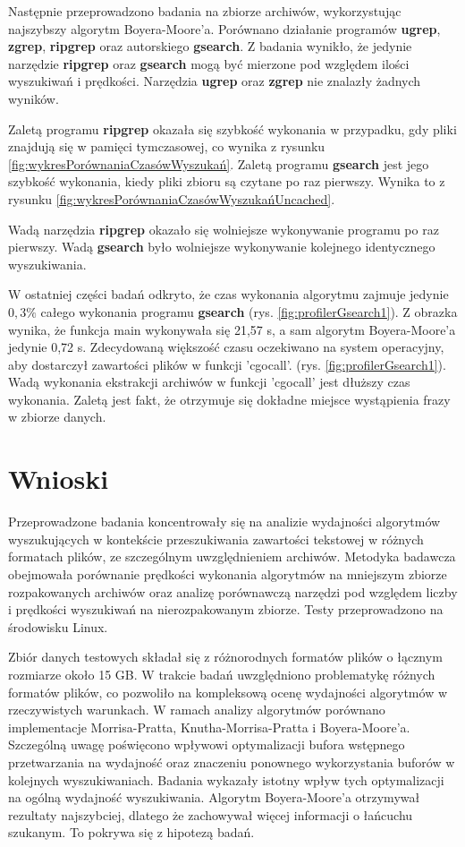 Następnie przeprowadzono badania na zbiorze archiwów, wykorzystując najszybszy algorytm 
Boyera-Moore'a. Porównano działanie programów \textbf{ugrep}, \textbf{zgrep},
\textbf{ripgrep} oraz autorskiego \textbf{gsearch}. Z badania wynikło, że
jedynie narzędzie \textbf{ripgrep} oraz \textbf{gsearch} mogą być mierzone pod
względem ilości wyszukiwań i prędkości. Narzędzia \textbf{ugrep} oraz 
\textbf{zgrep} nie znalazły żadnych wyników. 

Zaletą programu \textbf{ripgrep} okazała się szybkość wykonania w przypadku, gdy
pliki znajdują się w pamięci tymczasowej, co wynika z rysunku 
\ref{fig:wykresPorównaniaCzasówWyszukań}. Zaletą programu \textbf{gsearch} jest
jego szybkość wykonania, kiedy pliki zbioru są czytane po raz pierwszy. Wynika
to z rysunku \ref{fig:wykresPorównaniaCzasówWyszukańUncached}. 

Wadą narzędzia \textbf{ripgrep} okazało się wolniejsze wykonywanie programu po raz pierwszy.
Wadą \textbf{gsearch} było wolniejsze wykonywanie kolejnego identycznego wyszukiwania.

W ostatniej części badań odkryto, że czas wykonania algorytmu zajmuje jedynie
$0,3 \%$ całego wykonania programu \textbf{gsearch} (rys. \ref{fig:profilerGsearch1}).
Z obrazka wynika, że funkcja main wykonywała się 21,57 s, a sam algorytm 
Boyera-Moore'a jedynie 0,72 s. Zdecydowaną większość czasu oczekiwano na 
system operacyjny, aby dostarczył zawartości plików w funkcji 'cgocall'. 
(rys. \ref{fig:profilerGsearch1}). Wadą wykonania ekstrakcji archiwów w funkcji 
'cgocall' jest dłuższy czas wykonania. Zaletą jest fakt, że otrzymuje się 
dokładne miejsce wystąpienia frazy w zbiorze danych.

\section{Wnioski}

Przeprowadzone badania koncentrowały się na analizie wydajności algorytmów 
wyszukujących w kontekście przeszukiwania zawartości tekstowej w różnych formatach 
plików, ze szczególnym uwzględnieniem archiwów. Metodyka badawcza obejmowała porównanie
prędkości wykonania algorytmów na mniejszym zbiorze rozpakowanych archiwów oraz 
analizę porównawczą narzędzi pod względem liczby i prędkości wyszukiwań na 
nierozpakowanym zbiorze. Testy przeprowadzono na środowisku Linux.
 
Zbiór danych testowych składał się z różnorodnych formatów plików o łącznym 
rozmiarze około 15 GB. W trakcie badań
uwzględniono problematykę różnych formatów plików, co pozwoliło na kompleksową
ocenę wydajności algorytmów w rzeczywistych warunkach. W ramach analizy
algorytmów porównano implementacje Morrisa-Pratta, Knutha-Morrisa-Pratta i Boyera-Moore'a.
Szczególną uwagę poświęcono wpływowi optymalizacji bufora wstępnego przetwarzania
na wydajność oraz znaczeniu ponownego wykorzystania buforów w kolejnych wyszukiwaniach.
Badania wykazały istotny wpływ tych optymalizacji na ogólną wydajność wyszukiwania.
Algorytm Boyera-Moore'a otrzymywał rezultaty najszybciej, dlatego że zachowywał więcej 
informacji o łańcuchu szukanym. To pokrywa się z hipotezą badań.

